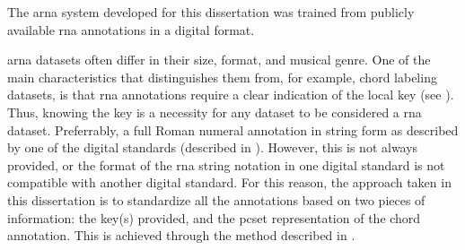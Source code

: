 

The \gls{arna} system developed for this dissertation was
trained from publicly available \gls{rna} annotations in a
digital format. 

\gls{arna} datasets often  differ in their size, format, and
musical genre. One of the main characteristics that
distinguishes them from, for example, chord labeling
datasets, is that \gls{rna} annotations require a clear
indication of the local key (see ).
Thus, knowing the key is a necessity for any dataset to be
considered a \gls{rna} dataset. Preferrably, a full Roman
numeral annotation in string form as described by one of the
digital standards (described in
). However, this is not
always provided, or the format of the \gls{rna} string
notation in one digital standard is not compatible with
another digital standard. For this reason, the approach
taken in this dissertation is to standardize all the
annotations based on two pieces of information: the key(s)
provided, and the \gls{pcset} representation of the chord
annotation. This is achieved through the method described in
.
